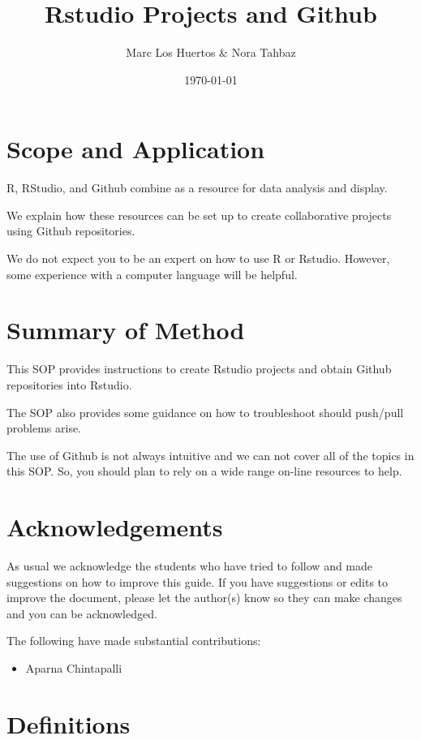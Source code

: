 \documentclass[12pt]{../SOP4_alpha}\usepackage[]{graphicx}\usepackage[]{xcolor}
\author{Marc Los Huertos \& Nora Tahbaz}
\title{Rstudio Projects and Github}
\date{\today}
\begin{document}
\maketitle

\section{Scope and Application}

\NP R, RStudio, and Github combine as a resource for data analysis and display.

\NP We explain how these resources can be set up to create collaborative projects using Github repositories. 

\NP We do not expect you to be an expert on how to use R or Rstudio. However, some experience with a computer language will be helpful. 

\section{Summary of Method}

\NP This SOP provides instructions to create Rstudio projects and obtain Github repositories into Rstudio. 

\NP The SOP also provides some guidance on how to troubleshoot should push/pull problems arise.

\NP The use of Github is not always intuitive and we can not cover all of the topics in this SOP. So, you should plan to rely on a wide range on-line resources to help.

\tableofcontents

\newpage

\section{Acknowledgements}

As usual we acknowledge the students who have tried to follow and made suggestions on how to improve this guide. If you have suggestions or edits to improve the document, please let the author(s) know so they can make changes and you can be acknowledged.

The following have made substantial contributions:

\begin{itemize}
\item Aparna Chintapalli
\end{itemize}

\section{Definitions}
\end{document}
